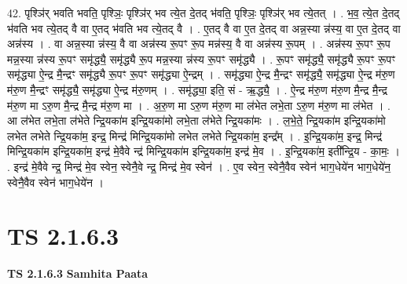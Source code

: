 \documentclass[17pt]{extarticle}
\begin{document}
42. पृश्ञि॑र् भवति भवति॒ पृश्ञिः॒ पृश्ञि॑र् भव त्ये॒त दे॒तद् भ॑वति॒ पृश्ञिः॒ पृश्ञि॑र् भव त्ये॒तत् । . भ॒व॒ त्ये॒त दे॒तद् भ॑वति भव त्ये॒तद् वै वा ए॒तद् भ॑वति भव त्ये॒तद् वै । . ए॒तद् वै वा ए॒त दे॒तद् वा अन्न॒स्या न्न॑स्य॒ वा ए॒त दे॒तद् वा अन्न॑स्य । . वा अन्न॒स्या न्न॑स्य॒ वै वा अन्न॑स्य रू॒पꣳ रू॒प मन्न॑स्य॒ वै वा अन्न॑स्य रू॒पम् । . अन्न॑स्य रू॒पꣳ रू॒प मन्न॒स्या न्न॑स्य रू॒पꣳ समृ॑द्ध्यै॒ समृ॑द्ध्यै रू॒प मन्न॒स्या न्न॑स्य रू॒पꣳ समृ॑द्ध्यै । . रू॒पꣳ समृ॑द्ध्यै॒ समृ॑द्ध्यै रू॒पꣳ रू॒पꣳ समृ॑द्ध्या ऐ॒न्द्र मै॒न्द्रꣳ समृ॑द्ध्यै रू॒पꣳ रू॒पꣳ समृ॑द्ध्या ऐ॒न्द्रम् । . समृ॑द्ध्या ऐ॒न्द्र मै॒न्द्रꣳ समृ॑द्ध्यै॒ समृ॑द्ध्या ऐ॒न्द्र म॑रु॒ण म॑रु॒ण मै॒न्द्रꣳ समृ॑द्ध्यै॒ समृ॑द्ध्या ऐ॒न्द्र म॑रु॒णम् । . समृ॑द्ध्या॒ इति॒ सं - ऋ॒द्ध्यै॒ । . ऐ॒न्द्र म॑रु॒ण म॑रु॒ण मै॒न्द्र मै॒न्द्र म॑रु॒ण मा ऽरु॒ण मै॒न्द्र मै॒न्द्र म॑रु॒ण मा । . अ॒रु॒ण मा ऽरु॒ण म॑रु॒ण मा ल॑भेत लभे॒ता ऽरु॒ण म॑रु॒ण मा ल॑भेत । . आ ल॑भेत लभे॒ता ल॑भेते न्द्रि॒यका॑म इन्द्रि॒यका॑मो लभे॒ता ल॑भेते न्द्रि॒यका॑मः । . ल॒भे॒ते॒ न्द्रि॒यका॑म इन्द्रि॒यका॑मो लभेत लभेते न्द्रि॒यका॑म॒ इन्द्र॒ मिन्द्र॑ मिन्द्रि॒यका॑मो लभेत लभेते न्द्रि॒यका॑म॒ इन्द्र᳚म् । . इ॒न्द्रि॒यका॑म॒ इन्द्र॒ मिन्द्र॑ मिन्द्रि॒यका॑म इन्द्रि॒यका॑म॒ इन्द्र॑ मे॒वैवे न्द्र॑ मिन्द्रि॒यका॑म इन्द्रि॒यका॑म॒ इन्द्र॑ मे॒व । . इ॒न्द्रि॒यका॑म॒ इती᳚न्द्रि॒य - का॒मः॒ । . इन्द्र॑ मे॒वैवे न्द्र॒ मिन्द्र॑ मे॒व स्वेन॒ स्वेनै॒वे न्द्र॒ मिन्द्र॑ मे॒व स्वेन॑ । . ए॒व स्वेन॒ स्वेनै॒वैव स्वेन॑ भाग॒धेये॑न भाग॒धेये॑न॒ स्वेनै॒वैव स्वेन॑ भाग॒धेये॑न । \newline
\pagebreak
{}
\section*{ TS 2.1.6.3 }

\textbf{TS 2.1.6.3 } \newline
\textbf{Samhita Paata} \newline
\end{document}
